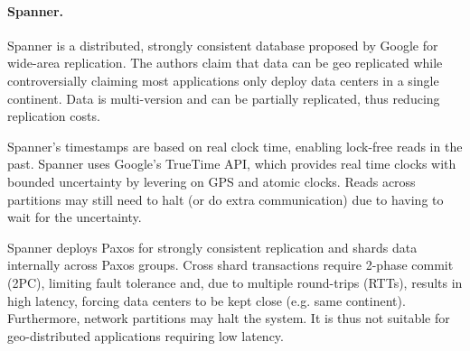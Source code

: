 
\paragraph{Spanner.} Spanner \cite{spanner} is a distributed, strongly consistent database proposed by Google for wide-area replication.
The authors claim that data can be geo replicated while controversially claiming most applications only deploy data centers in a single continent.
Data is multi-version and can be partially replicated, thus reducing replication costs.

Spanner's timestamps are based on real clock time, enabling lock-free reads in the past.
Spanner uses Google's TrueTime API, which provides real time clocks with bounded uncertainty by levering on GPS and atomic clocks.
Reads across partitions may still need to halt (or do extra communication) due to having to wait for the uncertainty.

Spanner deploys Paxos for strongly consistent replication and shards data internally across Paxos groups.
Cross shard transactions require 2-phase commit (2PC), limiting fault tolerance and, due to multiple round-trips (RTTs), results in high latency, forcing data centers to be kept close (e.g. same continent). 
Furthermore, network partitions may halt the system.
It is thus not suitable for geo-distributed applications requiring low latency.


